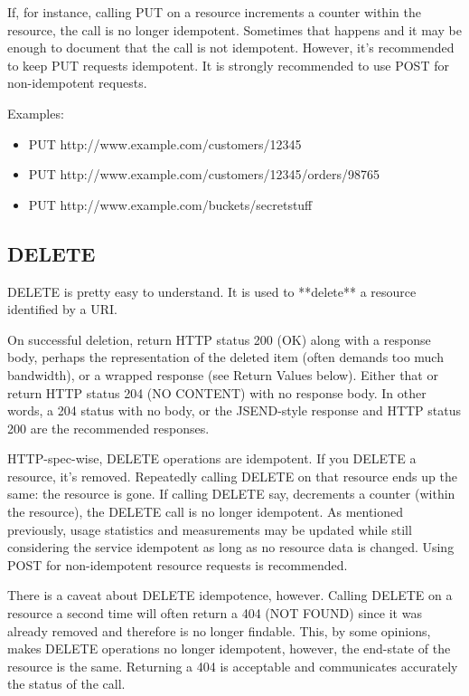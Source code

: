 \documentclass{report}
\begin{document}
	\par If, for instance, calling PUT on a resource increments a counter within the resource, the call is no longer idempotent. Sometimes that happens and it may be enough to document that the call is not idempotent. However, it's recommended to keep PUT requests idempotent. It is strongly recommended to use POST for non-idempotent requests.
	
	Examples:
	\begin{itemize}
		\item PUT http://www.example.com/customers/12345
		\item PUT http://www.example.com/customers/12345/orders/98765
		\item PUT http://www.example.com/buckets/secretstuff
	\end{itemize}
	\subsection{DELETE}
	\par DELETE is pretty easy to understand. It is used to **delete** a resource identified by a URI.
	
	\par On successful deletion, return HTTP status 200 (OK) along with a response body, perhaps the representation of the deleted item (often demands too much bandwidth), or a wrapped response (see Return Values below). Either that or return HTTP status 204 (NO CONTENT) with no response body. In other words, a 204 status with no body, or the JSEND-style response and HTTP status 200 are the recommended responses.
	
	\par  HTTP-spec-wise, DELETE operations are idempotent. If you DELETE a resource, it's removed. Repeatedly calling DELETE on that resource ends up the same: the resource is gone. If calling DELETE say, decrements a counter (within the resource), the DELETE call is no longer idempotent. As mentioned previously, usage statistics and measurements may be updated while still considering the service idempotent as long as no resource data is changed. Using POST for non-idempotent resource requests is recommended.
	
	\par  There is a caveat about DELETE idempotence, however. Calling DELETE on a resource a second time will often return a 404 (NOT FOUND) since it was already removed and therefore is no longer findable. This, by some opinions, makes DELETE operations no longer idempotent, however, the end-state of the resource is the same. Returning a 404 is acceptable and communicates accurately the status of the call.
	
\end{document}
